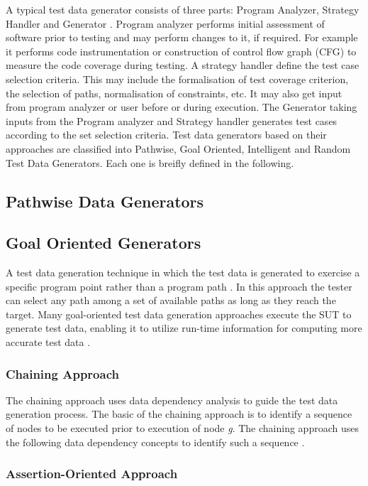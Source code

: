 A typical test data generator consists of three parts: Program Analyzer, Strategy Handler and Generator \cite{edvardsson1999survey}. Program analyzer performs initial assessment of software prior to testing and may perform changes to it, if required. For example it performs code instrumentation or construction of control flow graph (CFG) to measure the code coverage during testing. A strategy handler define the test case selection criteria. This may include the formalisation of test coverage criterion, the selection of paths, normalisation of constraints, etc. It may also get input from   program analyzer or user before or during execution. The Generator taking inputs from the Program analyzer and Strategy handler generates test cases according to the set selection criteria.  Test data generators based on their approaches are classified into 
Pathwise, Goal Oriented, Intelligent and Random Test Data Generators. Each one is breifly defined in the following.
\subsection{Pathwise Data Generators}

\subsection{Goal Oriented Generators}
A test data generation technique in which the test data is generated to exercise a specific program point rather than a program path \cite{chungautomated}.  In this approach the tester can select any path among a set of available paths as long as they reach the target. Many goal-oriented test data generation approaches execute the SUT to generate test data, enabling it to utilize run-time information for computing more accurate test data \cite{ferguson1996chaining}.

\subsubsection{Chaining Approach}
The chaining approach uses data dependency analysis to guide the test data generation process. The basic of the chaining approach is to identify a sequence of nodes to be executed prior to execution of node {\it {g}}. The chaining approach uses the following data dependency concepts to identify such a sequence \cite{ferguson1996chaining}.

\subsubsection{Assertion-Oriented Approach}

